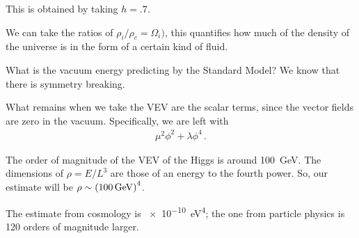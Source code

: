 \documentclass[main.tex]{subfiles}
\begin{document}
This is obtained by taking \(h = \num{.7}\). 

We can take the ratios of \(\rho_{i} / \rho_{c} = \Omega_{i})\), this quantifies how much of the density of the universe is in the form of a certain kind of fluid. 

What is the vacuum energy predicting by the Standard Model? 
We know that there is symmetry breaking. 

What remains when we take the VEV are the scalar terms, since the vector fields are zero in the vacuum. Specifically, we are left with 
%
\begin{align}
\mu^2 \phi^2 + \lambda \phi^{4}
\,.
\end{align}

The order of magnitude of the VEV of the Higgs is around \SI{100}{GeV}. 
The dimensions of \(\rho = E / L^3\) are those of an energy to the fourth power. So, our estimate will be \(\rho \sim \qty(\SI{100}{GeV})^{4}\). 

The estimate from cosmology is \SI{e-10}{eV^{4}}; the one from particle physics is 120 orders of magnitude larger.
\end{document}
